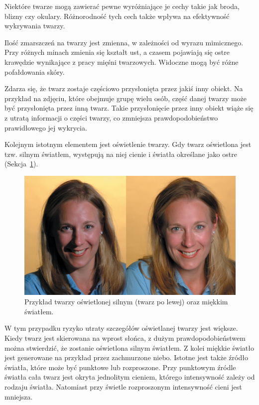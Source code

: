 \documentclass[a4paper,twoside,12pt]{book}
\begin{document}
    Niektóre twarze mogą zawierać pewne wyróżniające je cechy takie jak broda, blizny czy okulary.
    Różnorodność tych cech także wpływa na efektywność wykrywania twarzy.

    Ilość zmarszczeń na twarzy jest zmienna, w zależności od wyrazu mimicznego.
    Przy różnych minach zmienia się kształt ust, a czasem pojawiają się ostre krawędzie wynikające z pracy mięśni twarzowych.
    Widoczne mogą być różne pofałdowania skóry.

    Zdarza się, że twarz zostaje częściowo przysłonięta przez jakiś inny obiekt.
    Na przykład na zdjęciu,
    które obejmuje grupę wielu osób, część danej twarzy może być przysłonięta przez inną twarz.
    Takie przysłonięcie przez inny obiekt wiąże się z utratą informacji o części twarzy, co zmniejsza prawdopodobieństwo
    prawidłowego jej wykrycia.

    Kolejnym istotnym elementem jest oświetlenie twarzy.
    Gdy twarz oświetlona jest tzw. silnym światłem, występują na
    niej cienie i światła określane jako ostre (Sekcja~\ref{fig.oswietlenieTwarzy}).
    \begin{figure}
        \centering
        \includegraphics[width=12cm]{Obrazy/oswietlenieTwarzy.jpg}
        \caption{Przykład twarzy oświetlonej silnym (twarz po lewej) oraz miękkim światłem.~\cite{oswietlenieTwarzy}}
        \label{fig.oswietlenieTwarzy}
    \end{figure}
    W tym przypadku ryzyko utraty szczegółów oświetlanej twarzy jest większe.
    Kiedy twarz jest skierowana na wprost słońca, z dużym
    prawdopodobieństwem można stwierdzić, że zostanie oświetlona silnym światłem.
    Z kolei miękkie światło jest generowane na przykład przez zachmurzone niebo.
    Istotne jest także źródło światła, które
    może być punktowe lub rozproszone.
    Przy punktowym źródle światła cała twarz jest
    okryta jednolitym cieniem, którego intensywność zależy od rodzaju światła.
    Natomiast przy świetle rozproszonym intensywność cieni jest mniejsza.
\end{document}
